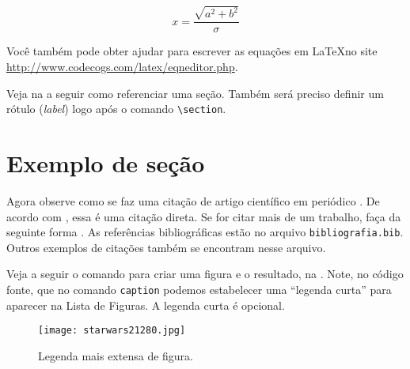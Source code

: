 \begin{equation}
x=\frac{\sqrt{a^{2}+b^{2}}}{\sigma}
\label{eq:teste}
\end{equation}


Você também pode obter ajudar para escrever as equações em \LaTeX no site \url{http://www.codecogs.com/latex/eqneditor.php}.



Veja na  a seguir como referenciar uma seção. Também será preciso definir um rótulo (\textit{label}) logo após o comando \texttt{\textbackslash section}.

\section{Exemplo de seção}\label{sec:exemplo_secao} 
Agora observe como se faz uma citação de artigo científico em periódico \cite{Gradvohl2014c}. De acordo com \textcite{Gradvohl2016}, essa é uma citação direta. Se for citar mais de um trabalho, faça da seguinte forma \cite{Caldana2017,Gradvohl2015}. As referências bibliográficas estão no arquivo \texttt{bibliografia.bib}. Outros exemplos de citações também se encontram nesse arquivo.

Veja a seguir o comando para criar uma figura e o resultado, na . Note, no código fonte, que no comando \texttt{caption} podemos estabelecer uma \enquote{legenda curta} para aparecer na Lista de Figuras. A legenda curta é opcional.

\begin{figure}[!htb]
\centering
\texttt{[image: starwars21280.jpg]}
\caption[Legenda curta de figura]{Legenda mais extensa de figura.}
\label{fig:xwing}
\end{figure}

